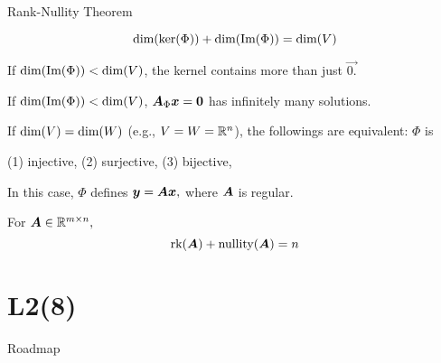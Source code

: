 \documentclass[handout,fleqn,aspectratio=169]{beamer}
\begin{document}
\begin{frame}{Rank-Nullity Theorem}

\plitemsep 0.07in
{
\plitemsep 0.07in
\thm 
$$\text{dim}(\ker(\Phi)) + \text{dim}(\text{Im}(\Phi)) = \text{dim}(V)$$
\vspace{-0.5cm}
\small
\bci 
\item If $\text{dim}(\text{Im}(\Phi)) < \text{dim}(V)$, the kernel contains more than just $\vec{0.}$
\item If $\text{dim}(\text{Im}(\Phi)) < \text{dim}(V)$, $\bm{A}_{\Phi} \bm{x} = \bm{0}$ has infinitely many solutions.

\item If $\text{dim}(V) = \text{dim}(W)$ (e.g., $V=W={\mathbb R}^n$), the followings are equivalent: $\Phi$ is
\plitemsep 0.01in
\bci
\item (1) injective, (2) surjective, (3) bijective, 

\item In this case, $\Phi$ defines $\bm{y} = \bm{A}\bm{x},$ where $\bm{A}$ is regular. 
\eci

\item {} For $\bm{A} \in {\mathbb R}^{m \times n},$
$$
\text{rk}(\bm{A}) + \text{nullity}(\bm{A}) = n
$$
\eci
}
{
\centering
{}
}
\end{frame}


\section{L2(8)}
\begin{frame}{Roadmap}

\plitemsep 0.1in

\bce[(1)] 
\item {}

\item {}

\ece
\end{frame}
\end{document}
